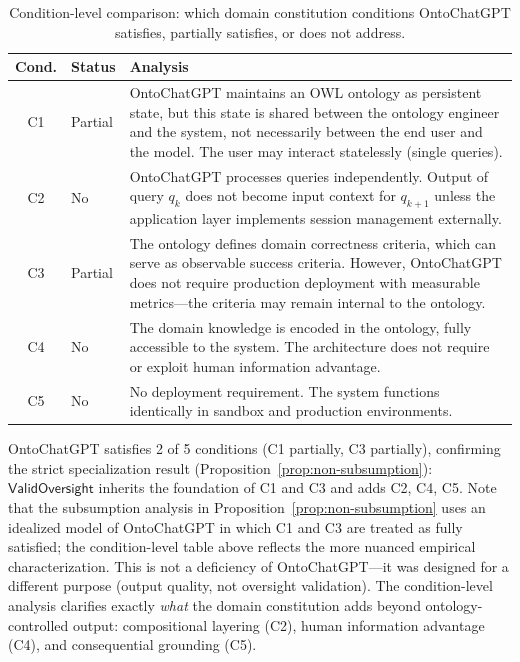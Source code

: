 \documentclass[11pt]{article}
\begin{document}
\begin{table}[h]
\centering
\caption{Condition-level comparison: which domain constitution conditions OntoChatGPT satisfies, partially satisfies, or does not address.}
\label{tab:condition-comparison}
\begin{tabular}{@{}clp{8cm}@{}}
\toprule
\textbf{Cond.} & \textbf{Status} & \textbf{Analysis} \\
\midrule
C1 & Partial & OntoChatGPT maintains an OWL ontology as persistent state, but this state is shared between the ontology engineer and the system, not necessarily between the end user and the model. The user may interact statelessly (single queries). \\
C2 & No & OntoChatGPT processes queries independently. Output of query $q_k$ does not become input context for $q_{k+1}$ unless the application layer implements session management externally. \\
C3 & Partial & The ontology defines domain correctness criteria, which can serve as observable success criteria. However, OntoChatGPT does not require production deployment with measurable metrics---the criteria may remain internal to the ontology. \\
C4 & No & The domain knowledge is encoded in the ontology, fully accessible to the system. The architecture does not require or exploit human information advantage. \\
C5 & No & No deployment requirement. The system functions identically in sandbox and production environments. \\
\bottomrule
\end{tabular}
\end{table}

OntoChatGPT satisfies 2 of 5 conditions (C1 partially, C3 partially), confirming the strict specialization result (Proposition~\ref{prop:non-subsumption}): $\mathsf{ValidOversight}$ inherits the foundation of C1 and C3 and adds C2, C4, C5.
Note that the subsumption analysis in Proposition~\ref{prop:non-subsumption} uses an idealized model of OntoChatGPT in which C1 and C3 are treated as fully satisfied; the condition-level table above reflects the more nuanced empirical characterization.
This is not a deficiency of OntoChatGPT---it was designed for a different purpose (output quality, not oversight validation).
The condition-level analysis clarifies exactly \emph{what} the domain constitution adds beyond ontology-controlled output: compositional layering (C2), human information advantage (C4), and consequential grounding (C5).
\end{document}
